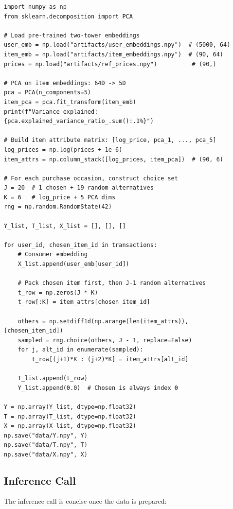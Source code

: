 \begin{lstlisting}
import numpy as np
from sklearn.decomposition import PCA

# Load pre-trained two-tower embeddings
user_emb = np.load("artifacts/user_embeddings.npy")  # (5000, 64)
item_emb = np.load("artifacts/item_embeddings.npy")  # (90, 64)
prices = np.load("artifacts/ref_prices.npy")          # (90,)

# PCA on item embeddings: 64D -> 5D
pca = PCA(n_components=5)
item_pca = pca.fit_transform(item_emb)
print(f"Variance explained: {pca.explained_variance_ratio_.sum():.1%}")

# Build item attribute matrix: [log_price, pca_1, ..., pca_5]
log_prices = np.log(prices + 1e-6)
item_attrs = np.column_stack([log_prices, item_pca])  # (90, 6)

# For each purchase occasion, construct choice set
J = 20  # 1 chosen + 19 random alternatives
K = 6   # log_price + 5 PCA dims
rng = np.random.RandomState(42)

Y_list, T_list, X_list = [], [], []

for user_id, chosen_item_id in transactions:
    # Consumer embedding
    X_list.append(user_emb[user_id])

    # Pack chosen item first, then J-1 random alternatives
    t_row = np.zeros(J * K)
    t_row[:K] = item_attrs[chosen_item_id]

    others = np.setdiff1d(np.arange(len(item_attrs)), [chosen_item_id])
    sampled = rng.choice(others, J - 1, replace=False)
    for j, alt_id in enumerate(sampled):
        t_row[(j+1)*K : (j+2)*K] = item_attrs[alt_id]

    T_list.append(t_row)
    Y_list.append(0.0)  # Chosen is always index 0

Y = np.array(Y_list, dtype=np.float32)
T = np.array(T_list, dtype=np.float32)
X = np.array(X_list, dtype=np.float32)
np.save("data/Y.npy", Y)
np.save("data/T.npy", T)
np.save("data/X.npy", X)
\end{lstlisting}

\subsection{Inference Call}

The inference call is concise once the data is prepared:

